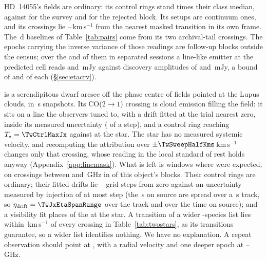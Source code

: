 HD~14055's fields are ordinary: its control rings stand \TwRingQHD{} times
their class median, against \TwRingQSurv{} for the survey and \TwBlockQMax{}
for the rejected block. Its setups are continuum ones, and its crossings lie
\TwHDMaskLo--\TwHDMaskHi\,km\,s$^{-1}$ from the nearest masked transition in
its own frame. The \TwPairSpanD\,d baselines of Table~\ref{tab:pairs} come from its two
archival-tail crossings. The \TwHDNDeep{} epochs carrying the inverse variance
of those readings are follow-up blocks outside the census; over the
\TwHDNDeepSepFirst{} and \TwHDNDeepSepSecond{} of them in separated sessions a line-like
emitter at the predicted cell reads \TwHDRepFirst{} and \TwHDRepSecond\,mJy against
discovery amplitudes of \TwHDDiscFirst{} and \TwHDDiscSecond\,mJy, a bound of
\TwHDFracFirst{} and \TwHDFracSecond{} of each (\S\ref{sec:etacrv}).

\BkAlmaName{} is a serendipitous dwarf \TwPbJx{} arcsec off the phase centre
of fields pointed at the Lupus clouds, in \TwOnSrcJx\,s snapshots. Its
CO($2\to1$) crossing is cloud emission filling the field: it sits on a line
the observers tuned to, with a drift fitted at the trial nearest zero, inside
its measured uncertainty (\TwCOStepErr{} of a step), and a control ring reaching $T_\star=\TwCtrlMaxJx$ against
\TwTStarCtrlJx{} at the star. The star has no measured systemic velocity, and
recomputing the attribution over $\pm\TwSweepHalfKms$\,km\,s$^{-1}$ changes
only that crossing, whose reading in the local standard of rest holds anyway
(Appendix~\ref{app:linemask}). What is left is
\TwNExcJxWord{} windows where \TwExpCtrlJx{} were expected, on
\TwJxNCrossExcWord{} crossings between \TwJxExcBandLo{} and
\TwJxExcBandHi\,GHz in \TwJxNBlockExcWord{} of this object's
\TwJxNBlockWord{} blocks. Their control rings are ordinary; their fitted
drifts lie \TwJxStepLo--\TwJxStepHi{} grid steps from zero against an
uncertainty measured by injection of at most \TwJxStepErr{} step (the
\TwOnSrcJx\,s on source are spread over a \TwJxSpanS\,s track, so
$\eta_{\rm drift}=\TwJxEtaSpanRange$ over the track and \TwJxEtaOnRange{}
over the time on source); and a visibility fit places \TwJxNLocalExcWord{} of the
\TwJxNCrossExcWord{} at the star. A transition of a wider \TwWideNSpecies-species list lies within
\TwWideDvMax\,km\,s$^{-1}$ of every crossing in Table~\ref{tab:twostars}, as
its \TwWideNTrans{} transitions guarantee, so a wider list identifies nothing.
We have no explanation. A repeat observation should point at \BkAlmaName,
with a radial velocity and one deeper epoch at
\TwJxExcBandLo--\TwJxExcBandHi\,GHz.

